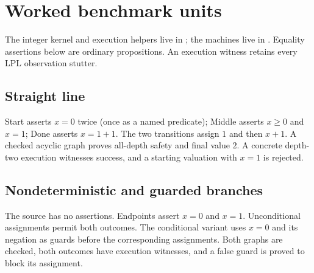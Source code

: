 \section{Worked benchmark units}\label{sec:examples}
The integer kernel and execution helpers live in ; the
machines live in . Equality assertions below are ordinary
propositions. An execution witness retains every LPL observation stutter.

\subsection{Straight line}
Start asserts $x=0$ twice (once as a named predicate); Middle asserts
$x\ge0$ and $x=1$; Done asserts $x=1+1$. The two transitions assign $1$
and then $x+1$. A checked acyclic graph proves all-depth safety and final
value $2$. A concrete depth-two execution witnesses success, and a
starting valuation with $x=1$ is rejected.

\subsection{Nondeterministic and guarded branches}
The source has no assertions. Endpoints assert $x=0$ and $x=1$.
Unconditional assignments permit both outcomes. The conditional variant
uses $x=0$ and its negation as guards before the corresponding assignments.
Both graphs are checked, both outcomes have execution witnesses, and a
false guard is proved to block its assignment.

